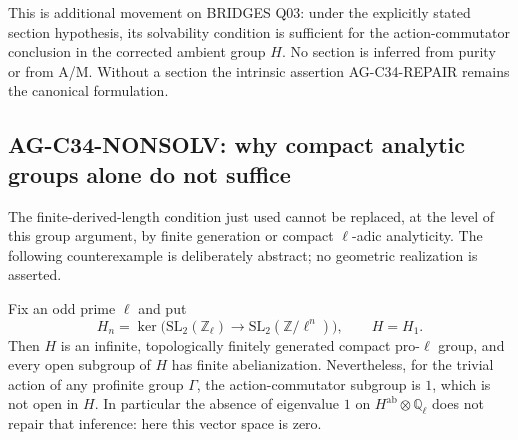 \documentclass[11pt,a4paper]{article}
\begin{document}
This is additional movement on BRIDGES Q03: under the explicitly stated
section hypothesis, its solvability condition is sufficient for the
action-commutator conclusion in the corrected ambient group $H$.
No section is inferred from purity or from A/M. Without a section the
intrinsic assertion AG-C34-REPAIR remains the canonical formulation.

\subsection{AG-C34-NONSOLV: why compact analytic groups alone do not suffice}
\label{ag:c34nonsolv}

The finite-derived-length condition just used cannot be replaced, at
the level of this group argument, by finite generation or compact
$\ell$-adic analyticity. The following counterexample is deliberately
abstract; no geometric realization is asserted.

Fix an odd prime $\ell$ and put
\[
 H_n=\ker\bigl(\mathrm{SL}_2(\mathbb Z_\ell)
            \longrightarrow\mathrm{SL}_2(\mathbb Z/\ell^n)\bigr),
 \qquad H=H_1.
\]
Then $H$ is an infinite, topologically finitely generated compact
pro-$\ell$ group, and every open subgroup of $H$ has finite
abelianization. Nevertheless, for the trivial action of any profinite
group $\Gamma$, the action-commutator subgroup is $1$, which is not
open in $H$. In particular the absence of eigenvalue $1$ on
$H^{\mathrm{ab}}\otimes\mathbb Q_\ell$ does not repair that
inference: here this vector space is zero.
\end{document}
